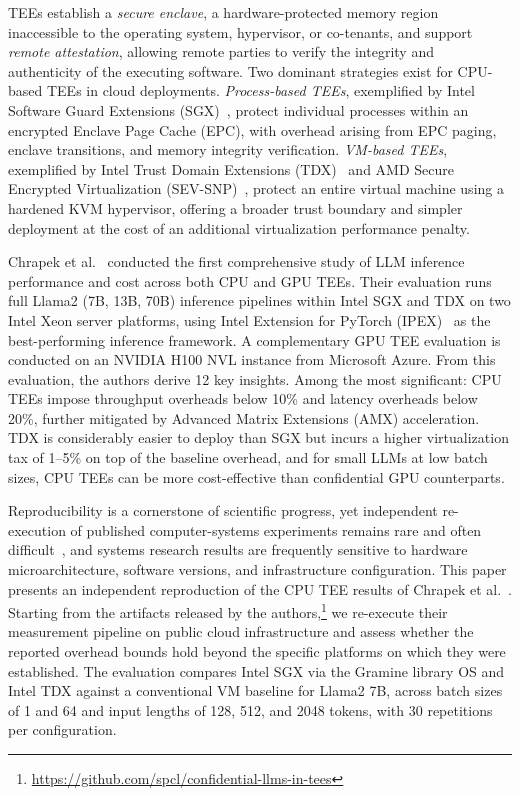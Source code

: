 \documentclass[sigconf]{acmart}
\begin{document}
TEEs establish a \emph{secure enclave}, a hardware-protected memory region inaccessible
to the operating system, hypervisor, or co-tenants, and support \emph{remote attestation},
allowing remote parties to verify the integrity and authenticity of the executing software.
Two dominant strategies exist for CPU-based TEEs in cloud deployments. \emph{Process-based
TEEs}, exemplified by Intel Software Guard Extensions (SGX)~\cite{intel_sgx}, protect
individual processes within an encrypted Enclave Page Cache (EPC), with overhead arising
from EPC paging, enclave transitions, and memory integrity verification. \emph{VM-based
TEEs}, exemplified by Intel Trust Domain Extensions (TDX)~\cite{intel_tdx} and AMD
Secure Encrypted Virtualization (SEV-SNP)~\cite{amd_sev}, protect an
entire virtual machine using a hardened KVM hypervisor, offering a broader trust boundary
and simpler deployment at the cost of an additional virtualization performance penalty.

Chrapek et al.~\cite{chrapek2025confidential} conducted the first comprehensive study of
LLM inference performance and cost across both CPU and GPU TEEs. Their evaluation runs full
Llama2 (7B, 13B, 70B) inference pipelines within Intel SGX and TDX on two Intel Xeon
server platforms, using Intel Extension for PyTorch (IPEX)~\cite{ipex} as the
best-performing inference framework. A complementary GPU TEE evaluation is conducted on
an NVIDIA H100 NVL instance from Microsoft Azure. From this evaluation, the authors
derive 12 key insights. Among the most significant: CPU TEEs impose throughput overheads
below 10\% and latency overheads below 20\%, further mitigated by Advanced Matrix
Extensions (AMX) acceleration. TDX is considerably easier to deploy than SGX but incurs
a higher virtualization tax of 1--5\% on top of the baseline overhead, and for small LLMs
at low batch sizes, CPU TEEs can be more cost-effective than confidential GPU
counterparts.

Reproducibility is a cornerstone of scientific progress, yet independent re-execution
of published computer-systems experiments remains rare and often
difficult~\cite{collberg2016repeatability}, and systems research results
are frequently sensitive to hardware microarchitecture, software versions, and
infrastructure configuration. This paper presents an independent reproduction of the
CPU TEE results of Chrapek et al.~\cite{chrapek2025confidential}. Starting from the
artifacts released by the authors,\footnote{\url{https://github.com/spcl/confidential-llms-in-tees}}
we re-execute their measurement pipeline on public cloud infrastructure and assess
whether the reported overhead bounds hold beyond the specific platforms on which they
were established. The evaluation compares Intel SGX via the Gramine library OS and
Intel TDX against a conventional VM baseline for Llama2 7B, across batch sizes of 1 and
64 and input lengths of 128, 512, and 2048 tokens, with 30 repetitions per configuration.
\end{document}
